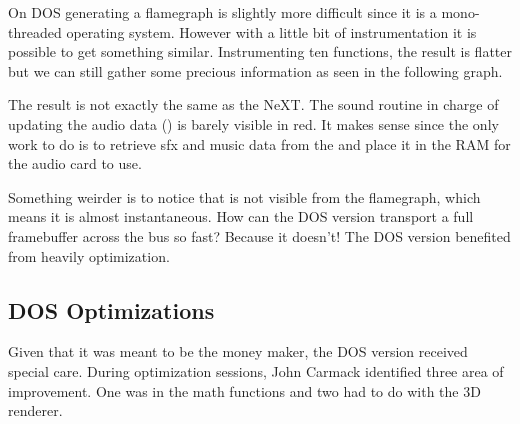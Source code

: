 On DOS generating a flamegraph is slightly more difficult since it is a mono-threaded operating system. However with a little bit of instrumentation it is possible to get something similar. Instrumenting ten functions, the result is flatter but we can still gather some precious information as seen in the following graph.\\
\par
\vspace{4mm}
\par
The result is not exactly the same as the NeXT. The sound routine in charge of updating the audio data () is barely visible in red. It makes sense since the only work to do is to retrieve sfx and music data from the  and place it in the RAM for the audio card to use.\\
\par
 Something weirder is to notice that  is not visible from the flamegraph, which means it is almost instantaneous. How can the DOS version transport a full framebuffer across the bus so fast? Because it doesn't! The DOS version benefited from heavily optimization.\\
\par


\subsection{DOS Optimizations}
Given that it was meant to be the money maker, the DOS version received special care. During optimization sessions, John Carmack identified three area of improvement. One was in the math functions and two had to do with the 3D renderer.\\
 \par
\par




